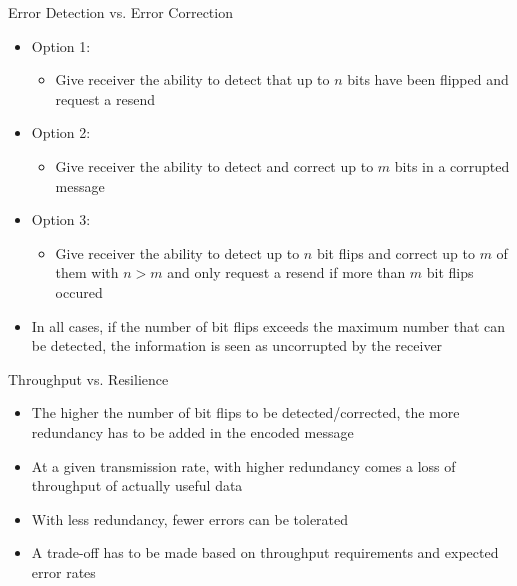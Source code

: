 \documentclass[aspectratio=169,hyperref={pdfpagelabels=false}]{beamer}
\begin{document}
\begin{frame}{Error Detection vs. Error Correction}

    \begin{itemize}
        \item Option 1:
        \begin{itemize}
            \item Give receiver the ability to detect that up to $n$ bits have been flipped and request a resend
        \end{itemize}
        \item Option 2:
        \begin{itemize}
            \item Give receiver the ability to detect and correct up to $m$ bits in a corrupted message
        \end{itemize}
        \item Option 3:
        \begin{itemize}
            \item Give receiver the ability to detect up to $n$ bit flips and correct up to $m$ of them with $n>m$ and only request a resend if more than $m$ bit flips occured
        \end{itemize}
        \item In all cases, if the number of bit flips exceeds the maximum number that can be detected, the information is seen as uncorrupted by the receiver
    \end{itemize}
\end{frame}



\begin{frame}{Throughput vs. Resilience}
    \begin{itemize}
        \item The higher the number of bit flips to be detected/corrected, the more redundancy has to be added in the encoded message
        \item At a given transmission rate, with higher redundancy comes a loss of throughput of actually useful data
        \item With less redundancy, fewer errors can be tolerated
        \item A trade-off has to be made based on throughput requirements and expected error rates
    \end{itemize}
\end{frame}
\end{document}
